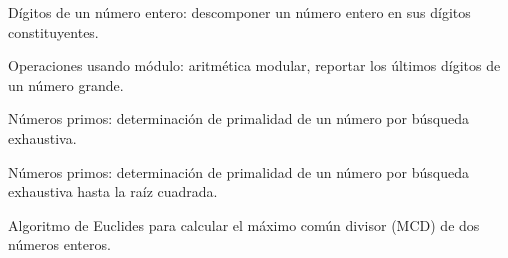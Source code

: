 \begin{itemize}
\item[\basic] Dígitos de un número entero: descomponer un número entero en sus
  dígitos constituyentes.
\item[\basic] Operaciones usando módulo: aritmética modular, reportar los
  últimos dígitos de un número grande.
\item[\basic] Números primos: determinación de primalidad de un número por
  búsqueda exhaustiva.
\item[\advanced] Números primos: determinación de primalidad de un número por
  búsqueda exhaustiva hasta la raíz cuadrada.
{\new\item[\advanced] Algoritmo de Euclides para  calcular el máximo común divisor (MCD) de dos números enteros.}
\end{itemize}

